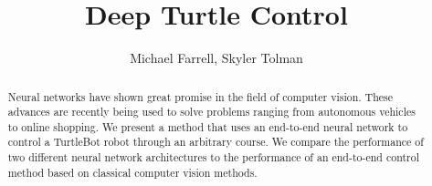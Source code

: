 \documentclass[letterpaper, 10 pt, conference]{ieeeconf}  %
\title{\LARGE \bf
Deep Turtle Control
}
\author{Michael Farrell, Skyler Tolman}
\begin{document}
\maketitle
\thispagestyle{empty}
\pagestyle{empty}

\begin{abstract}
  Neural networks have shown great promise in the field of computer vision.
  These advances are recently being used to solve problems ranging from
  autonomous vehicles to online shopping. We present a method that uses an
  end-to-end neural network to control a TurtleBot robot through an arbitrary
  course. We compare the performance of two different neural network
  architectures to the performance of an end-to-end control method based on
  classical computer vision methods.
\end{abstract}















\end{document}
